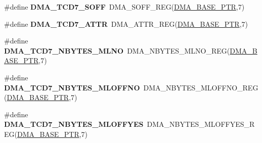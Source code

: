 \begin{DoxyCompactItemize}
\item 
\hypertarget{group___d_m_a___register___accessor___macros_gae369bbdf8d7426f5285a701adc541862}{}\#define {\bfseries D\+M\+A\+\_\+\+T\+C\+D7\+\_\+\+S\+O\+F\+F}~D\+M\+A\+\_\+\+S\+O\+F\+F\+\_\+\+R\+E\+G(\hyperlink{group___d_m_a___peripheral_ga6997fbc1b1973e9f27170217a3bd6f22}{D\+M\+A\+\_\+\+B\+A\+S\+E\+\_\+\+P\+T\+R},7)\label{group___d_m_a___register___accessor___macros_gae369bbdf8d7426f5285a701adc541862}

\item 
\hypertarget{group___d_m_a___register___accessor___macros_ga948cb5ad1adb59b3c6b0560f2529efbe}{}\#define {\bfseries D\+M\+A\+\_\+\+T\+C\+D7\+\_\+\+A\+T\+T\+R}~D\+M\+A\+\_\+\+A\+T\+T\+R\+\_\+\+R\+E\+G(\hyperlink{group___d_m_a___peripheral_ga6997fbc1b1973e9f27170217a3bd6f22}{D\+M\+A\+\_\+\+B\+A\+S\+E\+\_\+\+P\+T\+R},7)\label{group___d_m_a___register___accessor___macros_ga948cb5ad1adb59b3c6b0560f2529efbe}

\item 
\hypertarget{group___d_m_a___register___accessor___macros_ga110b7288144f75de7dc00a04c099653f}{}\#define {\bfseries D\+M\+A\+\_\+\+T\+C\+D7\+\_\+\+N\+B\+Y\+T\+E\+S\+\_\+\+M\+L\+N\+O}~D\+M\+A\+\_\+\+N\+B\+Y\+T\+E\+S\+\_\+\+M\+L\+N\+O\+\_\+\+R\+E\+G(\hyperlink{group___d_m_a___peripheral_ga6997fbc1b1973e9f27170217a3bd6f22}{D\+M\+A\+\_\+\+B\+A\+S\+E\+\_\+\+P\+T\+R},7)\label{group___d_m_a___register___accessor___macros_ga110b7288144f75de7dc00a04c099653f}

\item 
\hypertarget{group___d_m_a___register___accessor___macros_ga6dea6a9aae6fc4c980f6f7a3809c93db}{}\#define {\bfseries D\+M\+A\+\_\+\+T\+C\+D7\+\_\+\+N\+B\+Y\+T\+E\+S\+\_\+\+M\+L\+O\+F\+F\+N\+O}~D\+M\+A\+\_\+\+N\+B\+Y\+T\+E\+S\+\_\+\+M\+L\+O\+F\+F\+N\+O\+\_\+\+R\+E\+G(\hyperlink{group___d_m_a___peripheral_ga6997fbc1b1973e9f27170217a3bd6f22}{D\+M\+A\+\_\+\+B\+A\+S\+E\+\_\+\+P\+T\+R},7)\label{group___d_m_a___register___accessor___macros_ga6dea6a9aae6fc4c980f6f7a3809c93db}

\item 
\hypertarget{group___d_m_a___register___accessor___macros_ga081d406e1d570ce8c4a6c977e00d0201}{}\#define {\bfseries D\+M\+A\+\_\+\+T\+C\+D7\+\_\+\+N\+B\+Y\+T\+E\+S\+\_\+\+M\+L\+O\+F\+F\+Y\+E\+S}~D\+M\+A\+\_\+\+N\+B\+Y\+T\+E\+S\+\_\+\+M\+L\+O\+F\+F\+Y\+E\+S\+\_\+\+R\+E\+G(\hyperlink{group___d_m_a___peripheral_ga6997fbc1b1973e9f27170217a3bd6f22}{D\+M\+A\+\_\+\+B\+A\+S\+E\+\_\+\+P\+T\+R},7)\label{group___d_m_a___register___accessor___macros_ga081d406e1d570ce8c4a6c977e00d0201}


\end{DoxyCompactItemize}

